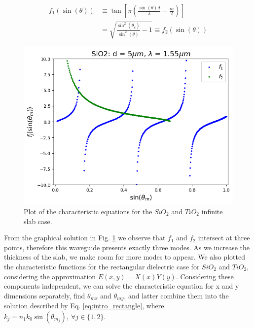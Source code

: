 \documentclass[conference, a4paper]{IEEEtran}
\begin{document}
\begin{equation}
    \begin{split}
        f_1(\sin(\theta)) 
        &\equiv \tan\left[ \pi \left(\frac{\sin(\theta) d}{\lambda} - \frac{m}{2}\right) \right] \\
        &= \sqrt{\frac{\sin^2(\overline{\theta}_c)}{\sin^2(\theta)} - 1} \equiv f_2(\sin(\theta))
    \end{split}
    \label{eq:intro_equation}
\end{equation}

\begin{figure}[H]
    \centering
    \centering
    \includegraphics[scale=0.4]{modes_SiO2_d5um_wv1.55um.png}
    \caption{$SiO_2$.}
    \caption{Plot of the characteristic equations for the $SiO_2$ and $TiO_2$ infinite slab case.}
    \label{fig:intro_equation}
\end{figure}

From the graphical solution in Fig. \ref{fig:intro_equation} we observe that $f_1$ and $f_2$ intersect at three points, therefore this waveguide presents exactly three modes. As we increase the thickness of the slab, we make room for more modes to appear. We also plotted the characteristic functions for the rectangular dielectric case for $SiO_2$ and $TiO_2$, considering the approximation $E(x, y) = X(x) Y(y)$. Considering these components independent, we can solve the characteristic equation for x and y dimensions separately, find $\theta_{mx}$ and $\theta_{my}$, and latter combine them into the solution described by Eq. \eqref{eq:intro_rectangle}, where $k_{j} = n_1 k_0 \sin(\theta_{m_j}), \ \forall j \in\{1, 2\}$.
\end{document}
